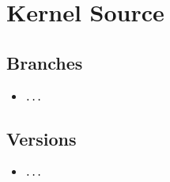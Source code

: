 %
%
%
%
%

\section{Kernel Source}

\subsection{Branches}
\begin{itemize}
\item \texttt{...}
\end{itemize}

\subsection{Versions}
\begin{itemize}
\item \texttt{...}
\end{itemize}

